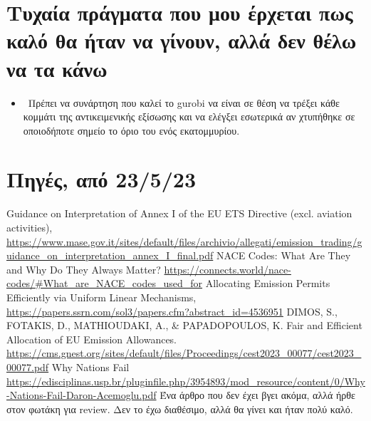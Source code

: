 \documentclass[a4paper,twoside,10pt]{article}
\begin{document}
\section{Τυχαία πράγματα που μου έρχεται πως καλό θα ήταν να γίνουν, αλλά δεν θέλω να τα κάνω}
\begin{itemize}[label*={}]
	\item \lbrack \ \rbrack Πρέπει να συνάρτηση που καλεί το gurobi να είναι σε θέση να τρέξει κάθε κομμάτι της αντικειμενικής εξίσωσης και να ελέγξει εσωτερικά αν χτυπήθηκε σε οποιοδήποτε σημείο το όριο του ενός εκατομμυρίου. 
\end{itemize}

\section*{Πηγές, από 23/5/23}
\begin{thebibliography}{999}
	
	Guidance on Interpretation of Annex I of the EU ETS Directive (excl. aviation activities),
	\url{https://www.mase.gov.it/sites/default/files/archivio/allegati/emission_trading/guidance_on_interpretation_annex_I_final.pdf}
	NACE Codes: What Are They and Why Do They Always Matter?
	\url{https://connects.world/nace-codes/#What_are_NACE_codes_used_for}
	Allocating Emission Permits Efficiently via Uniform Linear Mechanisms, \url{https://papers.ssrn.com/sol3/papers.cfm?abstract_id=4536951}
	DIMOS, S., FOTAKIS, D., MATHIOUDAKI, A., \& PAPADOPOULOS, K. Fair and Efficient Allocation of EU Emission Allowances. \url{https://cms.gnest.org/sites/default/files/Proceedings/cest2023_00077/cest2023_00077.pdf}
	Why Nations Fail
	\url{https://edisciplinas.usp.br/pluginfile.php/3954893/mod_resource/content/0/Why-Nations-Fail-Daron-Acemoglu.pdf}
	Ένα άρθρο που δεν έχει βγει ακόμα, αλλά ήρθε στον φωτάκη για review. Δεν το έχω διαθέσιμο, αλλά θα γίνει και ήταν πολύ καλό.
	

		
		
	
\end{thebibliography}
\end{document}
